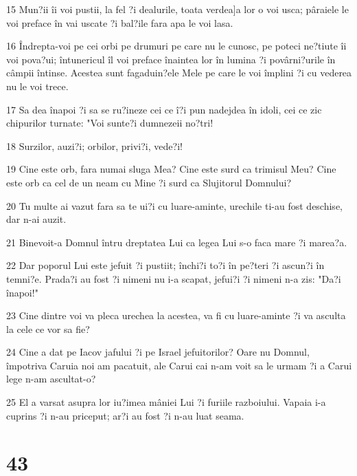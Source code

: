 \par 15 Mun?ii îi voi pustii, la fel ?i dealurile, toata verdea]a lor o voi usca; pâraiele le voi preface în vai uscate ?i bal?ile fara apa le voi lasa.
\par 16 Îndrepta-voi pe cei orbi pe drumuri pe care nu le cunosc, pe poteci ne?tiute îi voi pova?ui; întunericul îl voi preface înaintea lor în lumina ?i povârni?urile în câmpii întinse. Acestea sunt fagaduin?ele Mele pe care le voi împlini ?i cu vederea nu le voi trece.
\par 17 Sa dea înapoi ?i sa se ru?ineze cei ce î?i pun nadejdea în idoli, cei ce zic chipurilor turnate: "Voi sunte?i dumnezeii no?tri!
\par 18 Surzilor, auzi?i; orbilor, privi?i, vede?i!
\par 19 Cine este orb, fara numai sluga Mea? Cine este surd ca trimisul Meu? Cine este orb ca cel de un neam cu Mine ?i surd ca Slujitorul Domnului?
\par 20 Tu multe ai vazut fara sa te ui?i cu luare-aminte, urechile ti-au fost deschise, dar n-ai auzit.
\par 21 Binevoit-a Domnul întru dreptatea Lui ca legea Lui s-o faca mare ?i marea?a.
\par 22 Dar poporul Lui este jefuit ?i pustiit; închi?i to?i în pe?teri ?i ascun?i în temni?e. Prada?i au fost ?i nimeni nu i-a scapat, jefui?i ?i nimeni n-a zis: "Da?i înapoi!"
\par 23 Cine dintre voi va pleca urechea la acestea, va fi cu luare-aminte ?i va asculta la cele ce vor sa fie?
\par 24 Cine a dat pe Iacov jafului ?i pe Israel jefuitorilor? Oare nu Domnul, împotriva Caruia noi am pacatuit, ale Carui cai n-am voit sa le urmam ?i a Carui lege n-am ascultat-o?
\par 25 El a varsat asupra lor iu?imea mâniei Lui ?i furiile razboiului. Vapaia i-a cuprins ?i n-au priceput; ar?i au fost ?i n-au luat seama.

\chapter{43}

